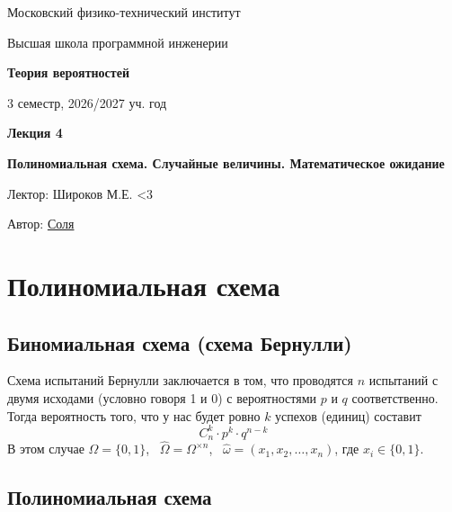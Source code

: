 \documentclass[11pt]{article}
\newcommand{\lectureNumber}{4}
\newcommand{\lectureTitle}{Полиномиальная схема. Случайные величины. Математическое ожидание}
\newcommand{\courseName}{Теория вероятностей}
\newcommand{\semester}{3 семестр, 2026/2027 уч. год}
\begin{document}
\begin{titlepage}
    \centering
    
    {\large Московский физико-технический институт \par}
    {\large Высшая школа программной инженерии \par}
    \vspace{2cm}

    {\Large \textbf{\courseName} \par}
    {\large \semester \par}
    
    \vspace*{\fill}

    {\Huge \textbf{Лекция \lectureNumber} \par}
    {\Huge \textbf{\lectureTitle} \par}
    
    \vspace*{\fill}
    
    {\large Лектор: Широков М.Е. <3\par}
    {\large Автор: \href{t.me/sol_m_07}{Соля} \par}

\end{titlepage}


\section{Полиномиальная схема}

\subsection{Биномиальная схема (схема Бернулли)}

Схема испытаний Бернулли заключается в том, что проводятся $n$ испытаний с двумя исходами (условно говоря 1 и 0) с вероятностями $p$ и $q$ соответственно.
Тогда вероятность того, что у нас будет ровно $k$ успехов (единиц) составит
\[C_n^k \cdot p^k \cdot q^{n - k}\]
В этом случае $\Omega = \{0, 1\}$, \ $\widehat{\Omega} = \Omega^{\times n}$, \ $\widehat{\omega} = (x_1, x_2, \ldots, x_n)$, где $x_i \in \{0, 1\}$.

\subsection{Полиномиальная схема}
\end{document}
